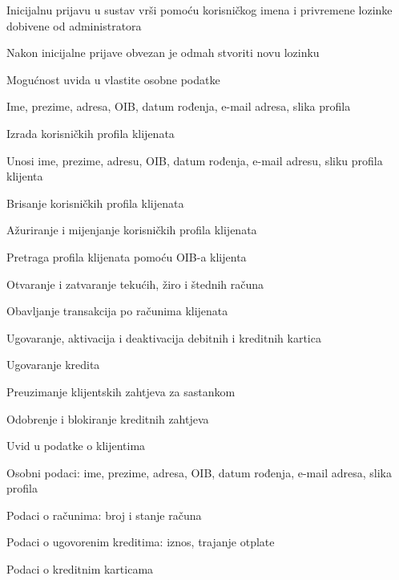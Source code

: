 \begin{packed_enum}
\begin{packed_enum}
					\item Inicijalnu prijavu u sustav vrši pomoću korisničkog imena i privremene lozinke dobivene od administratora
					\begin{packed_enum}
						\item Nakon inicijalne prijave obvezan je odmah stvoriti novu lozinku
					\end{packed_enum}
					\item Mogućnost uvida u vlastite osobne podatke
					\begin{packed_enum}
						\item Ime, prezime, adresa, OIB, datum rođenja, e-mail adresa, slika profila
					\end{packed_enum}
					\item Izrada korisničkih profila klijenata
					\begin{packed_enum}
						\item Unosi ime, prezime, adresu, OIB, datum rođenja, e-mail adresu, sliku profila klijenta
					\end{packed_enum}
					\item Brisanje korisničkih profila klijenata
					\item Ažuriranje i mijenjanje korisničkih profila klijenata
					\item Pretraga profila klijenata pomoću OIB-a klijenta
					\item Otvaranje i zatvaranje tekućih, žiro i štednih računa
					\item Obavljanje transakcija po računima klijenata
					\item Ugovaranje, aktivacija i deaktivacija debitnih i kreditnih kartica
					\item Ugovaranje kredita
					\item Preuzimanje klijentskih zahtjeva za sastankom
					
				\end{packed_enum}
			
				\item	{}
				
				\begin{packed_enum}
					
					\item Odobrenje i blokiranje kreditnih zahtjeva
					\item Uvid u podatke o klijentima
					\begin{packed_enum}
						\item Osobni podaci: ime, prezime, adresa, OIB, datum rođenja, e-mail adresa, slika profila
						\item Podaci o računima: broj i stanje računa
						\item Podaci o ugovorenim kreditima: iznos, trajanje otplate
						\item Podaci o kreditnim karticama
					\end{packed_enum}
					

\end{packed_enum}
\end{packed_enum}
